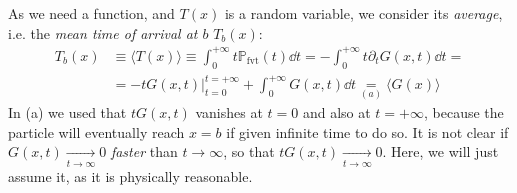 \documentclass[../template.tex]{subfiles}
\begin{document}
As we need a function, and $T(x)$ is a random variable, we consider its \textit{average}, i.e. the \textit{mean time of arrival at $b$} $T_b(x)$: 
\begin{align} \nonumber
    T_b(x) &\equiv \langle T(x) \rangle \equiv \int_0^{+\infty} t \mathbb{P}_{\mathrm{fvt}}(t) \dd{t} = -\int_0^{+\infty} t \partial_t G(x,t) \dd{t} =\\
    &= -t G(x,t)\Big|_{t=0}^{t=+\infty} + \int_0^{+\infty} G(x,t) \dd{t} \underset{(a)}{=} \langle G(x) \rangle \label{eqn:Gavg}
\end{align} 
In (a) we used that $t G(x,t)$ vanishes at $t=0$ and also at $t=+\infty$, because the particle will eventually reach $x=b$ if given infinite time to do so. It is not clear if $G(x,t)  \xrightarrow[t \to \infty]{}   0$ \textit{faster} than $t \to \infty$, so that $t G(x,t)  \xrightarrow[t \to \infty]{} 0$. Here, we will just assume it, as it is physically reasonable.

\medskip
\end{document}
